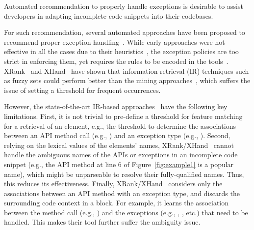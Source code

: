 \begin{Observation} 
Automated recommendation to properly handle exceptions is desirable to
assist developers in adapting incomplete code snippets into their
codebases.
\end{Observation}


For such recommendation, several automated approaches have been
proposed to recommend proper exception
handling~\cite{xrank-fse20,barbosa-bsse12,chanchal-scam14,barbosa-tse18,barbosa-tse16}. While
early approaches were not effective in all the cases due to their
heuristics~\cite{barbosa-bsse12}, the exception policies are too
strict in enforcing them, yet requires the rules to be encoded in the
tools~\cite{barbosa-tse16,barbosa-saner18}. XRank~\cite{xrank-fse20}
and XHand~\cite{xrank-fse20} have shown that information retrieval
(IR) techniques such as fuzzy sets could perform better than the
mining approaches~\cite{chanchal-scam14}, which suffers the issue of
setting a threshold for frequent occurrences.

However, the state-of-the-art IR-based approaches~\cite{xrank-fse20}
have the following key limitations. First, it is not trivial to
pre-define a threshold for feature matching for a retrieval of an
element, e.g., the threshold to determine the associations between an
API method call (e.g., ) and an exception
type (e.g., ). Second, relying on the
lexical values of the elements' names, XRank/XHand~\cite{xrank-fse20}
cannot handle the ambiguous names of the APIs or exceptions in an
incomplete code snippet (e.g., the API method  at line 6 of
Figure~\ref{fig:example1} is a popular name), which might be
unparseable to resolve their fully-qualified names. Thus, this reduces
its effectiveness. Finally, XRank/XHand~\cite{xrank-fse20} considers
only the associations between an API method with an exception type,
and discards the surrounding code context in a  block.
For example, it learns the association between the method call (e.g.,
) and the exceptions (e.g.,
, , etc.)
that need to be handled. This makes their tool further suffer the
ambiguity issue.


